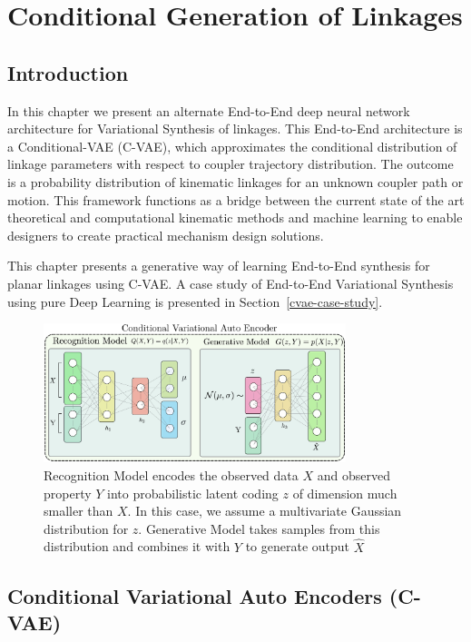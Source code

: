   \chapter{Conditional Generation of Linkages}\label{ch-cave-linkage}
\section{Introduction}
 In this chapter we present an alternate End-to-End deep neural network architecture for Variational Synthesis of linkages. This End-to-End architecture is a Conditional-VAE (C-VAE), which approximates the conditional distribution of linkage parameters with respect to coupler trajectory distribution. The outcome is a probability distribution of kinematic linkages for an unknown coupler path or motion. This framework functions as a bridge between the current state of the art theoretical and computational kinematic methods and  machine learning to enable designers to create practical mechanism design solutions.
 
 This chapter presents a generative way of learning End-to-End synthesis for planar linkages using C-VAE. A case study of End-to-End Variational Synthesis using pure Deep Learning is presented in Section~\ref{cvae-case-study}.
 

\begin{figure}
\centering
\includegraphics[width=250pt]{jmd-19/figure/fig_cvae.eps}
  \caption{Recognition Model encodes the observed data $X$ and observed property $Y$ into probabilistic latent coding $z$ of dimension much smaller than $X$. In this case, we assume a multivariate Gaussian distribution for $z$. Generative Model takes samples from this distribution and combines it with $Y$ to generate output $\hat{X}$}
\label{cvae_arch}
\end{figure}

 
\section{Conditional Variational Auto Encoders (C-VAE)}\label{sec_condi_vae}

